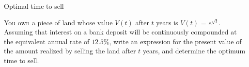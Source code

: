 \documentclass[9pt]{beamer}
\begin{document}





\begin{frame}{Optimal time to sell}

    You own a piece of land whose value $V(t)$ after $t$ years is $V(t)$ = $e^{\sqrt{t}}$. Assuming that interest on a bank deposit will be continuously compounded at the equivalent annual rate of $12.5\%$, write an expression for the present value of the amount realized by selling the land after $t$ years, and determine the optimum time to sell.
    
\end{frame}
\end{document}
